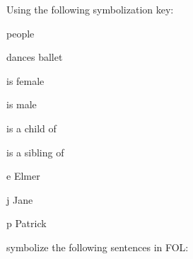\solutions
\problempart
\label{pr.FOLballet}
Using the following symbolization key:
\begin{ekey}
\item[\text{domain}] people
\item[\atom{D}{x}]  dances ballet
\item[\atom{F}{x}]  is female
\item[\atom{M}{x}]  is male
\item[\atom{C}{x,y}]  is a child of 
\item[\atom{S}{x,y}]  is a sibling of 
\item[e] Elmer
\item[j] Jane
\item[p] Patrick
\end{ekey}
symbolize the following sentences in FOL:
